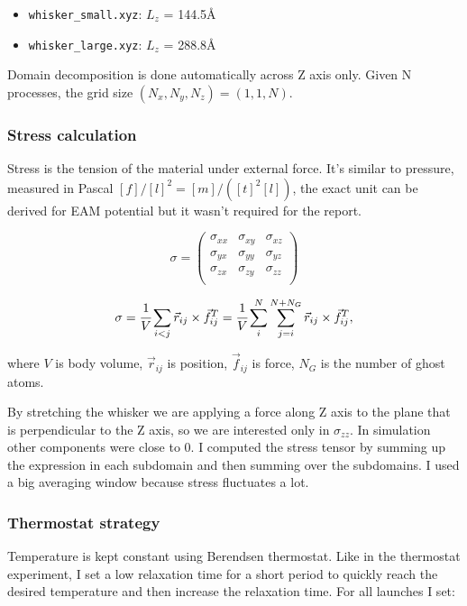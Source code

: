 \documentclass[12pt,a4paper]{article}
\newcommand{\mat}[1]{\vec{#1}}
\begin{document}
\begin{itemize}
	\item \verb|whisker_small.xyz|: $L_z$ = 144.5Å
	\item \verb|whisker_large.xyz|: $L_z$ = 288.8Å
\end{itemize}

Domain decomposition is done automatically across Z axis only. Given N processes, the grid size $(N_x, N_y, N_z) = (1, 1, N)$.

\subsubsection*{Stress calculation}

Stress is the tension of the material under external force. It's similar to pressure, measured in Pascal $[f]/[l]^2 = [m]/([t]^2[l])$, the exact unit can be derived for EAM potential but it wasn't required for the report.

\[
\sigma =
\begin{pmatrix}
	\sigma_{xx} &\sigma_{xy} &\sigma_{xz}\\
	\sigma_{yx} &\sigma_{yy} &\sigma_{yz}\\
	\sigma_{zx} &\sigma_{zy} &\sigma_{zz}\\
\end{pmatrix}
\]

\[
\sigma = \cfrac{1}{V} \sum_{i<j} \mat{r}_{ij} \times \mat{f}^T_{ij} = \cfrac{1}{V} \sum_i^{N} \sum_{j=i}^{N+N_G} \mat{r}_{ij} \times \mat{f}^T_{ij},
\]

where $V$ is body volume, $\mat{r}_{ij}$ is position, $\mat{f}_{ij}$ is force, $N_G$ is the number of ghost atoms.

By stretching the whisker we are applying a force along Z axis to the plane that is perpendicular to the Z axis, so we are interested only in $\sigma_{zz}$. In simulation other components were close to 0. I computed the stress tensor by summing up the expression in each subdomain and then summing over the subdomains. I used a big averaging window because stress fluctuates a lot.

\subsubsection*{Thermostat strategy}
Temperature is kept constant using Berendsen thermostat. Like in the thermostat experiment, I set a low relaxation time for a short period to quickly reach the desired temperature and then increase the relaxation time. For all launches I set:
\end{document}
